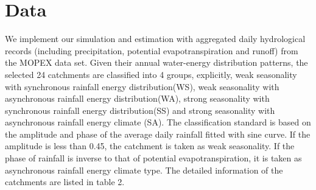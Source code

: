 \documentclass[review]{elsarticle}
\begin{document}
\section{Data}
We implement our simulation and estimation with aggregated daily hydrological records (including precipitation, potential evapotranspiration and runoff) from the MOPEX data set\citep{duan2006model}. Given their annual water-energy distribution patterns, the selected 24 catchments are classified into 4 groups, explicitly, weak seasonality with synchronous rainfall energy distribution(WS), weak seasonality with asynchronous rainfall energy distribution(WA), strong seasonality with  synchronous rainfall energy distribution(SS) and strong seasonality with asynchronous rainfall energy climate (SA). The classification standard is based on the amplitude and phase of the average daily rainfall fitted with sine curve. If the amplitude is less than 0.45, the catchment is taken as weak seasonality. If the phase of rainfall is inverse to that of potential evapotranspiration, it is taken as asynchronous rainfall energy climate type. The detailed information of the catchments are listed in table 2. 
 
\end{document}
